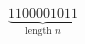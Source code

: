 \documentclass[preview]{standalone}
\begin{document}
\begin{align*}
\underbrace{1100001011}_{\text{length } n}
\end{align*}
\end{document}
